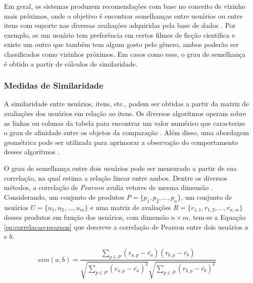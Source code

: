         Em geral, os sistemas produzem recomendações com base no conceito de vizinho mais próximos, onde o objetivo é encontrar semelhanças entre usuários ou entre itens com suporte nas diversas avaliações adquiridas pela base de dados \cite{Mustafa2017}. Por exemplo, se um usuário tem preferência em certos filmes de ficção científica e existe um outro que também tem algum gosto pelo gênero, ambos poderão ser classificados como vizinhos próximos. Em casos como esse, o grau de semelhança é obtido a partir de cálculos de similaridade.
        
        \subsubsection{Medidas de Similaridade} \label{sssec:similaridade}
        
        A similaridade entre usuários, itens, etc., podem ser obtidas a partir da matriz de avaliações dos usuários em relação ao itens. Os diversos algoritmos operam sobre as linhas ou colunas da tabela para encontrar um valor numérico que caracterize o grau de afinidade entre os objetos da comparação \cite{Aggarwal2016}. Além disso, uma abordagem geométrica pode ser utilizada para aprimorar a observação do comportamento desses algoritmos \cite{Jones1987}.
        
        O grau de semelhança entre dois usuários pode ser mensurado a partir de sua correlação, na qual estima a relação linear entre ambos. Dentre os diversos métodos, a correlação de \textit{Pearson} avalia vetores de mesma dimensão \cite{Ricci2010}. Considerando, um conjunto de produtos $P=\{p_1, p_2, ..., p_n\}$, um conjunto de usuários $U = \{u_1, u_2, ..., u_m\}$ e uma matriz de avaliações $R=\{r_{1,1}, r_{1,2}, ..., r_{n, m}\}$ desses produtos em função dos usuários, com dimensão  $n\times m$, tem-se a Equação \ref{eq:correlacao-pearson} que descreve a correlação de Pearson entre dois usuários $a$ e $b$.
             
        \begin{equation}
             sim(a, b) = \frac{\sum_{p\in P}(r_{a, p}-\bar{r_a})(r_{b, p}-\bar{r_b})}{\sqrt{\sum_{p\in P}(r_{a, p}-\bar{r_a})^2}\sqrt{\sum_{p\in P}(r_{b, p}-\bar{r_b})^2}}\label{eq:correlacao-pearson}
        \end{equation}
        
